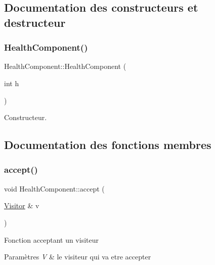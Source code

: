 \subsection{Documentation des constructeurs et destructeur}
\mbox{\label{structHealthComponent_aeabc12eec0a3f1ba8f966ce068724d16}} 
\subsubsection{\texorpdfstring{Health\+Component()}{HealthComponent()}}
{\footnotesize\ttfamily Health\+Component\+::\+Health\+Component (\begin{DoxyParamCaption}\item[{int}]{h }\end{DoxyParamCaption})\hspace{0.3cm}{\ttfamily [inline]}}



Constructeur. 



\subsection{Documentation des fonctions membres}
\mbox{\label{structHealthComponent_a47bb95e02765b03a387366b866046860}} 
\subsubsection{\texorpdfstring{accept()}{accept()}}
{\footnotesize\ttfamily void Health\+Component\+::accept (\begin{DoxyParamCaption}\item[{\hyperlink{classVisitor}{Visitor} \&}]{v }\end{DoxyParamCaption})\hspace{0.3cm}{\ttfamily [virtual]}}

Fonction acceptant un visiteur


\begin{DoxyParams}{Paramètres}
{\em V} & le visiteur qui va etre accepter \\
\hline
\end{DoxyParams}


